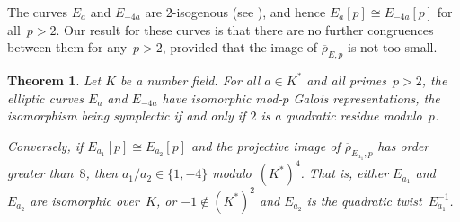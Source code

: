 \documentclass[12pt]{amsart}
\newcommand{\rhobar}{{\overline{\rho}}}
\numberwithin{equation}{section}
\newtheorem{theorem}{Theorem}[section]
\theoremstyle{definition}
\theoremstyle{remark}
\begin{document}
The curves $E_a$ and $E_{-4a}$ are $2$-isogenous (see
\cite[p. 336]{SilvermanI}), and hence $E_a[p]\cong E_{-4a}[p]$ for
all~$p>2$.  Our result for these curves is that there are no further
congruences between them for any~$p>2$, provided that the image of
$\rhobar_{E,p}$ is not too small.

\begin{theorem}\label{T:j=1728}
Let $K$ be a number field.  For all $a \in K^*$ and all primes~$p>2$,
the elliptic curves $E_a$ and $E_{-4a}$ have isomorphic mod-$p$ Galois
representations, the isomorphism being symplectic if and only if $2$
is a quadratic residue modulo~$p$.

Conversely, if $E_{a_1}[p]\cong E_{a_2}[p]$ and the projective image
of $\rhobar_{E_{a_1},p}$ has order greater than~$8$, then $a_1/a_2
\in\{1,-4\}$ modulo~$(K^*)^4$.  That is, either $E_{a_1}$
and~$E_{a_2}$ are isomorphic over~$K$, or $-1\notin(K^*)^2$ and
$E_{a_2}$ is the quadratic twist~$E_{a_1}^{-1}$.
\end{theorem}
\end{document}
